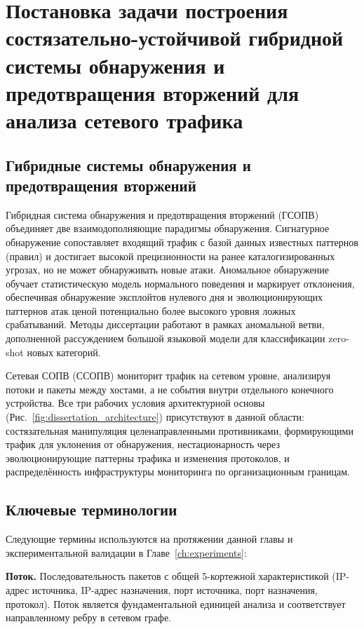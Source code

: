 \section{Постановка задачи построения состязательно-устойчивой гибридной системы обнаружения и предотвращения вторжений для анализа сетевого трафика}
\label{sec:nidps_context}

\subsection{Гибридные системы обнаружения и предотвращения вторжений}

Гибридная система обнаружения и предотвращения вторжений (ГСОПВ)~\cite{Buczak2016,Ahmad2021,Aldweesh2020,Ferrag2020,Paxson1999} объединяет две взаимодополняющие парадигмы обнаружения. Сигнатурное обнаружение сопоставляет входящий трафик с базой данных известных паттернов (правил) и достигает высокой прецизионности на ранее каталогизированных угрозах, но не может обнаруживать новые атаки. Аномальное обнаружение обучает статистическую модель нормального поведения и маркирует отклонения, обеспечивая обнаружение эксплойтов нулевого дня и эволюционирующих паттернов атак ценой потенциально более высокого уровня ложных срабатываний. Методы диссертации работают в рамках аномальной ветви, дополненной рассуждением большой языковой модели для классификации zero-shot новых категорий.

Сетевая СОПВ (ССОПВ) мониторит трафик на сетевом уровне, анализируя потоки и пакеты между хостами, а не события внутри отдельного конечного устройства. Все три рабочих условия архитектурной основы (Рис.~\ref{fig:dissertation_architecture}) присутствуют в данной области: состязательная манипуляция целенаправленными противниками, формирующими трафик для уклонения от обнаружения, нестационарность через эволюционирующие паттерны трафика и изменения протоколов, и распределённость инфраструктуры мониторинга по организационным границам.


\subsection{Ключевые терминологии}

Следующие термины используются на протяжении данной главы и экспериментальной валидации в Главе~\ref{ch:experiments}:

\noindent\textbf{Поток.} Последовательность пакетов с общей 5-кортежной характеристикой (IP-адрес источника, IP-адрес назначения, порт источника, порт назначения, протокол). Поток является фундаментальной единицей анализа и соответствует направленному ребру в сетевом графе.

